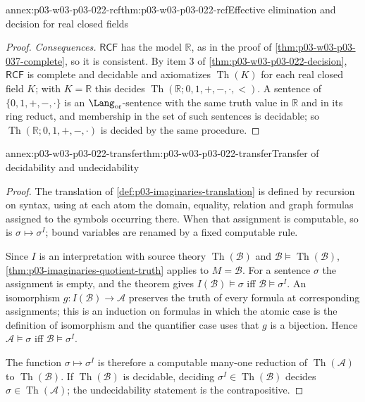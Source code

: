 \begin{annexitem}{annex:p03-w03-p03-022-rcf}{thm:p03-w03-p03-022-rcf}{Effective elimination and decision for real closed fields}
\begin{proof}
\emph{Consequences.} \(\mathsf{RCF}\) has the model \(\mathbb R\), as in the
proof of \cref{thm:p03-w03-p03-037-complete}, so it is consistent. By item 3
of \cref{thm:p03-w03-p03-022-decision}, \(\mathsf{RCF}\) is complete and
decidable and axiomatizes \(\operatorname{Th}(K)\) for each real closed
field \(K\); with \(K=\mathbb R\) this decides
\(\operatorname{Th}(\mathbb R;0,1,+,-,\cdot,<)\). A sentence of
\(\{0,1,+,-,\cdot\}\) is an \(\Lang_{\mathrm{or}}\)-sentence with the same
truth value in \(\mathbb R\) and in its ring reduct, and membership in the
set of such sentences is decidable; so
\(\operatorname{Th}(\mathbb R;0,1,+,-,\cdot)\) is decided by the same
procedure.
\end{proof}
\end{annexitem}

\begin{annexitem}{annex:p03-w03-p03-022-transfer}{thm:p03-w03-p03-022-transfer}{Transfer of decidability and undecidability}
\begin{proof}
The translation of \cref{def:p03-imaginaries-translation} is defined by
recursion on syntax, using at each atom the domain, equality, relation and
graph formulas assigned to the symbols occurring there. When that
assignment is computable, so is \(\sigma\mapsto\sigma^I\); bound variables
are renamed by a fixed computable rule.

Since \(I\) is an interpretation with source theory \(\operatorname{Th}(\mathcal B)\)
and \(\mathcal B\models\operatorname{Th}(\mathcal B)\),
\cref{thm:p03-imaginaries-quotient-truth} applies to \(M=\mathcal B\). For a
sentence \(\sigma\) the assignment is empty, and the theorem gives
\(I(\mathcal B)\models\sigma\) iff \(\mathcal B\models\sigma^I\). An
isomorphism \(g:I(\mathcal B)\to\mathcal A\) preserves the truth of every
formula at corresponding assignments; this is an induction on formulas in
which the atomic case is the definition of isomorphism and the quantifier
case uses that \(g\) is a bijection. Hence \(\mathcal A\models\sigma\) iff
\(\mathcal B\models\sigma^I\).

The function \(\sigma\mapsto\sigma^I\) is therefore a computable many-one
reduction of \(\operatorname{Th}(\mathcal A)\) to \(\operatorname{Th}(\mathcal B)\).
If \(\operatorname{Th}(\mathcal B)\) is decidable, deciding
\(\sigma^I\in\operatorname{Th}(\mathcal B)\) decides
\(\sigma\in\operatorname{Th}(\mathcal A)\); the undecidability statement is the
contrapositive.
\end{proof}
\end{annexitem}
